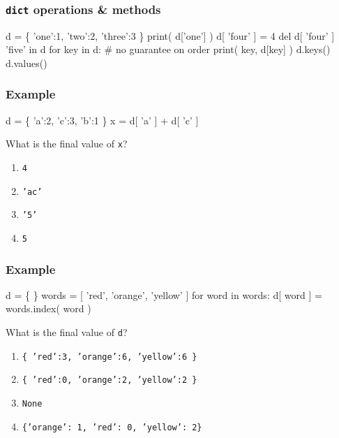 \documentclass[11pt]{beamer}
\begin{document}
\begin{frame}[fragile]
  \frametitle{\texttt{dict} operations \& methods}
  \Enlarge

  \begin{semiverbatim}
d = \{ 'one':1, 'two':2, 'three':3 \}
print( d['one'] )
d[ 'four' ] = 4
del d[ 'four' ]
'five' in d
for key in d:  # no guarantee on order
    print( key, d[key] )
d.keys()
d.values()
  \end{semiverbatim}
\end{frame}

\begin{frame}[fragile]
  \frametitle{Example}
  \Enlarge

  \begin{semiverbatim}
d = \{ 'a':2, 'c':3, 'b':1 \}
x = d[ 'a' ] + d[ 'c' ]
  \end{semiverbatim}
  What is the final value of \texttt{x}?
  \begin{enumerate}[label=\Alph*]
  \item  \texttt{4}
  \item  \texttt{'ac'}
  \item  \texttt{'5'}
  \item  \texttt{5}
  \end{enumerate}
\end{frame}

\begin{frame}[fragile]
  \frametitle{Example}
  \Enlarge

  \begin{semiverbatim}
d = \{ \}
words = [ 'red', 'orange', 'yellow' ]
for word in words:
    d[ word ] = words.index( word )
  \end{semiverbatim}
  What is the final value of \texttt{d}?
  \begin{enumerate}[label=\Alph*]
  \item  \texttt{\{ 'red':3, 'orange':6, 'yellow':6 \}}
  \item  \texttt{\{ 'red':0, 'orange':2, 'yellow':2 \}}
  \item  \texttt{None}
  \item  \texttt{\{'orange': 1, 'red': 0, 'yellow': 2\}}  %
  \end{enumerate}
\end{frame}
\end{document}
